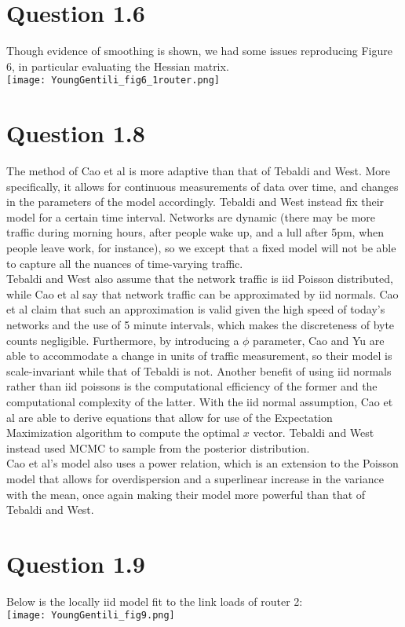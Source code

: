 \documentclass[10pt]{article}
\begin{document}
\section*{Question 1.6}
Though evidence of smoothing is shown, we had some issues reproducing Figure 6, in particular evaluating the Hessian matrix.\\
\texttt{[image: YoungGentili\_fig6\_1router.png]}\\

\section*{Question 1.8}
The method of Cao et al is more adaptive than that of Tebaldi and West. More specifically, it allows for continuous measurements of data over time, and changes in the parameters of the model accordingly. Tebaldi and West instead fix their model for a certain time interval. Networks are dynamic (there may be more traffic during morning hours, after people wake up, and a lull after 5pm, when people leave work, for instance), so we except that a fixed model will not be able to capture all the nuances of time-varying traffic.\\

Tebaldi and West also assume that the network traffic is iid Poisson distributed, while Cao et al say that network traffic can be approximated by iid normals. Cao et al claim that such an approximation is valid given the high speed of today's networks and the use of 5 minute intervals, which makes the discreteness of byte counts negligible. Furthermore, by introducing a $\phi$ parameter, Cao and Yu are able to accommodate a change in units of traffic measurement, so their model is scale-invariant while that of Tebaldi is not. Another benefit of using iid normals rather than iid poissons is the computational efficiency of the former and the computational complexity of the latter. With the iid normal assumption, Cao et al are able to derive equations that allow for use of the Expectation Maximization algorithm to compute the optimal $x$ vector. Tebaldi and West instead used MCMC to sample from the posterior distribution.\\

Cao et al's model also uses a power relation, which is an extension to the Poisson model that allows for overdispersion and a superlinear increase in the variance with the mean, once again making their model more powerful than that of Tebaldi and West.
\section*{Question 1.9}
Below is the locally iid model fit to the link loads of router 2:\\
\texttt{[image: YoungGentili\_fig9.png]}\\
\end{document}
